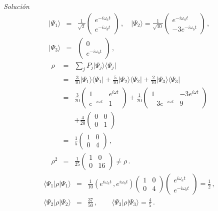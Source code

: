\documentclass[twocolumn,aps,eqsecnum]{revtex4}
\providecommand{\bra}[1]{\langle #1 \rvert}
\providecommand{\ket}[1]{\lvert #1 \rangle}
\begin{document}
\textit{Soluci\'on}
%
\begin{eqnarray*}
\ket{\Psi_1} &=& \frac{1}{\sqrt{2}} \left( \begin{array}{c} e^{-i \omega_a t} \\
	e^{-i \omega_b t}\end{array} \right) \,, \quad 
\ket{\Psi_2} =\frac{1}{\sqrt{10}} \left( \begin{array}{c} e^{-i \omega_a t} \\
	-3e^{-i \omega_b t}\end{array} \right) \,, \\
\ket{\Psi_3} &=& \left( \begin{array}{c} 0 \\
	e^{-i \omega_b t}\end{array} \right) \,,
\end{eqnarray*}
%
\begin{eqnarray*}
\rho &=& \sum_j P_j \ket{\Psi_j} \bra{\Psi_j} 	\\
	&=&\frac{3}{10} \ket{\Psi_1} \bra{\Psi_1} 
	+\frac{5}{10} \ket{\Psi_2} \bra{\Psi_2} 
	+\frac{2}{10}\ket{\Psi_3} \bra{\Psi_3} 	\\
&=& \frac{3}{20} \left( \begin{array}{cc} 1& e^{i \omega t} \\
	e^{-i \omega t} &1 \end{array} \right) 
	+\frac{1}{20} \left( \begin{array}{cc} 1& -3e^{i \omega t} \\
	-3e^{-i \omega t} &9 \end{array} \right) 	\\
	&& +\frac{4}{20} \left( \begin{array}{cc} 0& 0 \\
	0 &1 \end{array} \right) 	\\
	&=& \frac{1}{5} \left( \begin{array}{cc} 1& 0 \\
	0 &4 \end{array} \right) \,, 	\\
\rho^2 &=&\frac{1}{25} \left( \begin{array}{cc} 1& 0 \\
	0 &16 \end{array} \right) \neq \rho \,. 	
\end{eqnarray*}
%
\begin{eqnarray*}
\bra{\Psi_1} \rho \ket{\Psi_1} &=& \frac{1}{10} 
	\left( e^{i\omega_a t} \,, e^{i\omega_b t} \right) 
	\left( \begin{array}{cc} 1& 0 \\ 0 &4 \end{array} \right) 
\left( \begin{array}{c} e^{i \omega_a t} \\ e^{-i \omega_b t} 
	\end{array} \right)  =\frac{1}{2} 	\,, 	\\
\bra{\Psi_2} \rho \ket{\Psi_2} &=& \frac{37}{50} \,, \qquad
	\bra{\Psi_3} \rho \ket{\Psi_3} =\frac{4}{5} \,.
\end{eqnarray*}
\end{document}

